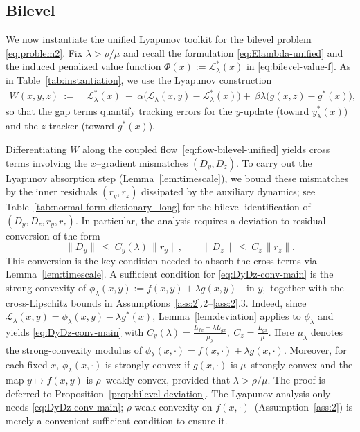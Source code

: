 \documentclass{article}
\newcommand{\1}{\mathbf{1}}
\begin{document}
 
\subsection{Bilevel}\label{subsec:main-bilevel}
We now instantiate the unified Lyapunov toolkit for the bilevel problem \ref{eq:problem2}.
Fix $\lambda>\rho/\mu$ and recall the formulation \eqref{eq:Elambda-unified} and the induced penalized value function
$\Phi(x):=\mathcal L_\lambda^*(x)$ in \eqref{eq:bilevel-value-f}.
As in Table~\ref{tab:instantiation}, we use the Lyapunov construction
\[
\begin{aligned}
W(x,y,z)\ :=\ &\mathcal L_\lambda^*(x)\ +\ \alpha\bigl(\mathcal L_\lambda(x,y)-\mathcal L_\lambda^*(x)\bigr)+\ \beta\lambda\bigl(g(x,z)-g^*(x)\bigr),
\end{aligned}
\]
so that the gap terms quantify tracking errors for the $y$-update (toward $y_\lambda^*(x)$)
and the $z$-tracker (toward $g^*(x)$). 

Differentiating $W$ along the coupled flow~\eqref{eq:flow-bilevel-unified} yields cross terms involving the
$x$--gradient mismatches $(D_y,D_z)$.
To carry out the Lyapunov absorption step (Lemma~\ref{lem:timescale}), we bound these mismatches by the inner residuals
$(r_y,r_z)$ dissipated by the auxiliary dynamics; see Table~\ref{tab:normal-form-dictionary_long} for the bilevel identification of $(D_y,D_z,r_y,r_z)$.
In particular, the analysis requires a deviation-to-residual conversion of the form
\begin{equation}\label{eq:DyDz-conv-main}
\|D_y\|\ \le\ C_y(\lambda)\,\|r_y\|,
\qquad
\|D_z\|\ \le\ C_z\,\|r_z\|.
\end{equation}
This conversion is the key condition needed to absorb the cross terms via Lemma~\ref{lem:timescale}. A sufficient condition for \eqref{eq:DyDz-conv-main} is the strong convexity of
$\phi_\lambda(x,y):=f(x,y)+\lambda g(x,y)
\quad\text{in $y$},$ together with the cross-Lipschitz bounds in Assumptions~\ref{ass:2}.2--\ref{ass:2}.3.
Indeed, since $\mathcal L_\lambda(x,y)=\phi_\lambda(x,y)-\lambda g^*(x)$, Lemma~\ref{lem:deviation} applies to $\phi_\lambda$ and yields \eqref{eq:DyDz-conv-main} with $C_y(\lambda)=\frac{L_{fx}+\lambda L_{gx}}{\mu_\lambda},\ C_z=\frac{L_{gx}}{\mu}$.
Here $\mu_\lambda$ denotes the strong-convexity modulus of
$\phi_\lambda(x,\cdot)=f(x,\cdot)+\lambda g(x,\cdot)$. Moreover, for each fixed $x$, $\phi_\lambda(x,\cdot)$ is strongly convex if $g(x,\cdot)$ is $\mu$--strongly convex and
the map $y\mapsto f(x,y)$ is $\rho$--weakly convex, provided that $\lambda>\rho/\mu$.
The proof is deferred to Proposition~\ref{prop:bilevel-deviation}.
The Lyapunov analysis only needs \eqref{eq:DyDz-conv-main}; $\rho$-weak convexity on $f(x,\cdot)$~(Assumption~\ref{ass:2}) is merely a convenient sufficient condition to ensure it.
\end{document}
